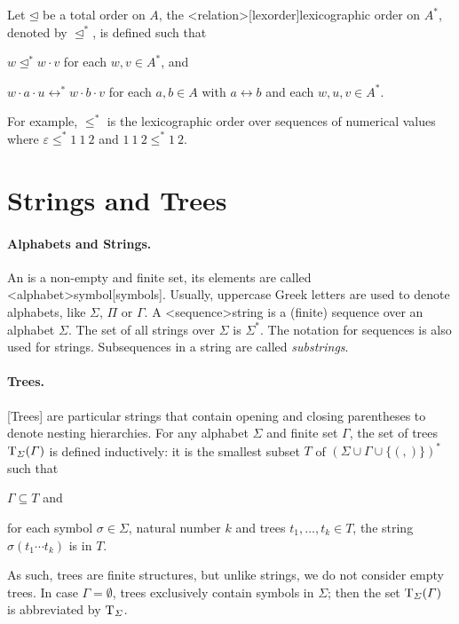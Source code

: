 \documentclass[../document.tex]{subfiles}
\begin{document}
    Let \(\unlhd\) be a total order on \(A\), the <relation>[lexorder]{lexicographic order} on \(A^*\), denoted by \(\unlhd^*\), is defined such that
    \begin{compactenum}
        \item \(w \unlhd^* w \cdot v\) for each \(w, v \in A^*\), and
        \item \(w\cdot a\cdot u \rel^* w\cdot b\cdot v \) for each \(a,b \in A\) with \(a \rel b\) and each \(w,u,v \in A^*\).
    \end{compactenum}
    For example, \(\leq^*\) is the lexicographic order over sequences of numerical values where \(\varepsilon \leq^* 1\:1\:2\) and \(1\:1\:2\leq^*1\:2\).


    \section{Strings and Trees}\label{sec:preliminaries:trees}
    \paragraph{Alphabets and Strings.}
    An  is a non-empty and finite set, its elements are called <alphabet>{symbol}[symbols].
    Usually, uppercase Greek letters are used to denote alphabets, like \(\varSigma\), \(\varPi\) or \(\varGamma\).
    A <sequence>{string} is a (finite) sequence over an alphabet \(\varSigma\).
    The set of all strings over \(\varSigma\) is \(\varSigma^*\).
    The notation for sequences is also used for strings.
    Subsequences in a string are called \emph{substrings}.

    \paragraph{Trees.}
    [Trees] are particular strings that contain opening and closing parentheses to denote nesting hierarchies.
    For any alphabet \(\varSigma\) and finite set \(\varGamma\), the set of trees \(\operatorname{T}_\varSigma(\varGamma)\) is defined inductively: it is the smallest subset \(T\) of \((\varSigma \cup \varGamma \cup \{ (, )\})^*\) such that
    \begin{inparaenum}[(i)]
        \item \(\varGamma \subseteq T\) and
        \item for each symbol \(\sigma \in \varSigma\), natural number \(k\) and trees \(t_1, \ldots, t_k \in T\), the string \(\sigma(t_1 \cdots t_k)\) is in \(T\).
    \end{inparaenum}
    As such, trees are finite structures, but unlike strings, we do not consider empty trees.
    In case \(\varGamma = \emptyset\), trees exclusively contain symbols in \(\varSigma\); then the set \(\operatorname{T}_\varSigma(\varGamma)\) is abbreviated by \(\operatorname{T}_\varSigma\).
\end{document}
